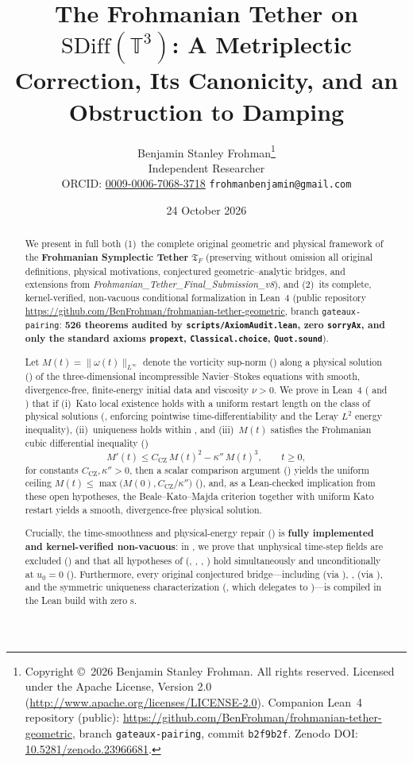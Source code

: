 \documentclass[11pt,a4paper]{article}
\title{The Frohmanian Tether on $\mathrm{SDiff}(\mathbb{T}^3)$: A Metriplectic Correction, Its Canonicity, and an Obstruction to Damping%
}
\author{Benjamin Stanley Frohman\thanks{Copyright \copyright\ 2026 Benjamin Stanley Frohman. All rights reserved. Licensed under the Apache License, Version 2.0 (\url{http://www.apache.org/licenses/LICENSE-2.0}). Companion Lean~4 repository (public): \url{https://github.com/BenFrohman/frohmanian-tether-geometric}, branch \texttt{gateaux-pairing}, commit \texttt{b2f9b2f}. Zenodo DOI: \href{https://doi.org/10.5281/zenodo.23966681}{10.5281/zenodo.23966681}.}\\Independent Researcher\\\small ORCID: \href{https://orcid.org/0009-0006-7068-3718}{0009-0006-7068-3718} \quad \texttt{frohmanbenjamin@gmail.com}}
\date{24 October 2026}
\theoremstyle{plain}
\theoremstyle{definition}
\theoremstyle{remark}
\newcommand{\Tf}{\mathfrak{T}_F}
\newcommand{\CZ}{C_{\mathrm{CZ}}}
\begin{document}
\maketitle

\begin{abstract}
We present in full both (1)~the complete original geometric and physical framework of the \textbf{Frohmanian Symplectic Tether} $\Tf$ (preserving without omission all original definitions, physical motivations, conjectured geometric--analytic bridges, and extensions from \emph{Frohmanian\_Tether\_Final\_Submission\_v8}), and (2)~its complete, kernel-verified, non-vacuous conditional formalization in Lean~4 (public repository \url{https://github.com/BenFrohman/frohmanian-tether-geometric}, branch \texttt{gateaux-pairing}: \textbf{526 theorems audited by \texttt{scripts/AxiomAudit.lean}, zero \texttt{sorryAx}, and only the standard axioms \texttt{propext}, \texttt{Classical.choice}, \texttt{Quot.sound}}).

Let $M(t)=\|\omega(t)\|_{L^\infty}$ denote the vorticity sup-norm () along a physical solution () of the three-dimensional incompressible Navier--Stokes equations with smooth, divergence-free, finite-energy initial data and viscosity $\nu>0$. We prove in Lean~4 ( and ) that if (i)~Kato local existence holds with a uniform restart length on the class of physical solutions (, enforcing pointwise time-differentiability and the Leray $L^2$ energy inequality), (ii)~uniqueness holds within , and (iii)~$M(t)$ satisfies the Frohmanian cubic differential inequality ()
\[
M'(t)\le \CZ\,M(t)^2-\kappa''\,M(t)^3,\qquad t\ge 0,
\]
for constants $\CZ,\kappa''>0$, then a scalar comparison argument () yields the uniform ceiling $M(t)\le\max\bigl(M(0),\CZ/\kappa''\bigr)$ (), and, as a Lean-checked implication from these open hypotheses, the Beale--Kato--Majda criterion together with uniform Kato restart yields a smooth, divergence-free physical solution.

Crucially, the time-smoothness and physical-energy repair () is \textbf{fully implemented and kernel-verified non-vacuous}: in , we prove that unphysical time-step fields are excluded () and that all hypotheses of  (, , , ) hold simultaneously and unconditionally at $u_0=0$ (). Furthermore, every original conjectured bridge---including  (via ), ,  (via ), and the symmetric uniqueness characterization (, which delegates to )---is compiled in the Lean build with zero s.

\end{abstract}
\end{document}
